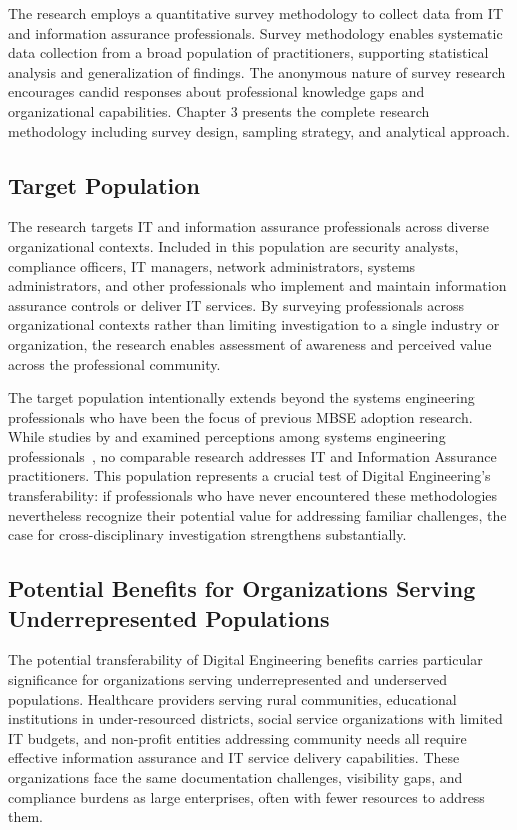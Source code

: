 The research employs a quantitative survey methodology to collect data from IT and information assurance professionals. Survey methodology enables systematic data collection from a broad population of practitioners, supporting statistical analysis and generalization of findings. The anonymous nature of survey research encourages candid responses about professional knowledge gaps and organizational capabilities. Chapter 3 presents the complete research methodology including survey design, sampling strategy, and analytical approach.

\subsection{Target Population}

The research targets IT and information assurance professionals across diverse organizational contexts. Included in this population are security analysts, compliance officers, IT managers, network administrators, systems administrators, and other professionals who implement and maintain information assurance controls or deliver IT services. By surveying professionals across organizational contexts rather than limiting investigation to a single industry or organization, the research enables assessment of awareness and perceived value across the professional community.

The target population intentionally extends beyond the systems engineering professionals who have been the focus of previous MBSE adoption research. While studies by \citeauthor{Call_2024} and \citeauthor{Henderson_McDermott_Salado_2024} examined perceptions among systems engineering professionals~\parencite{Call_2024, Henderson_McDermott_Salado_2024}, no comparable research addresses IT and Information Assurance practitioners. This population represents a crucial test of Digital Engineering's transferability: if professionals who have never encountered these methodologies nevertheless recognize their potential value for addressing familiar challenges, the case for cross-disciplinary investigation strengthens substantially.

\subsection{Potential Benefits for Organizations Serving Underrepresented Populations}

The potential transferability of Digital Engineering benefits carries particular significance for organizations serving underrepresented and underserved populations. Healthcare providers serving rural communities, educational institutions in under-resourced districts, social service organizations with limited IT budgets, and non-profit entities addressing community needs all require effective information assurance and IT service delivery capabilities. These organizations face the same documentation challenges, visibility gaps, and compliance burdens as large enterprises, often with fewer resources to address them.

